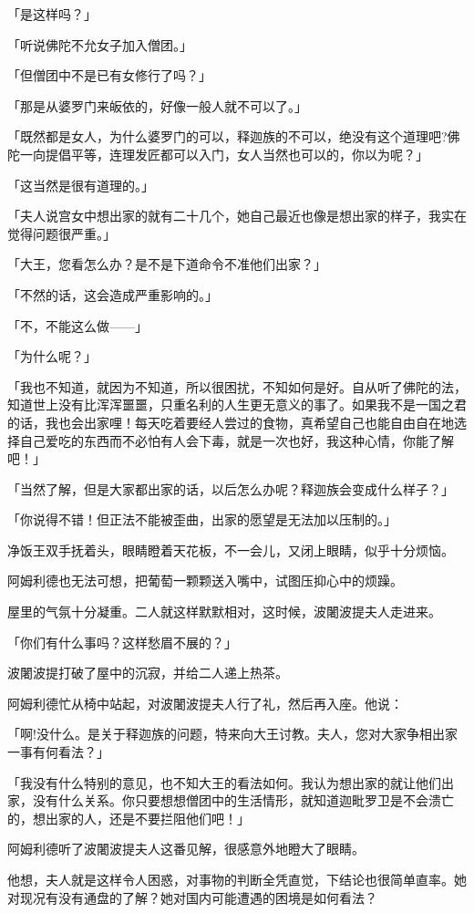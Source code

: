 \documentclass[twoside,openany]{book}
\begin{document}
「是这样吗？」

「听说佛陀不允女子加入僧团。」

「但僧团中不是已有女修行了吗？」

「那是从婆罗门来皈依的，好像一般人就不可以了。」

「既然都是女人，为什么婆罗门的可以，释迦族的不可以，绝没有这个道理吧?佛陀一向提倡平等，连理发匠都可以入门，女人当然也可以的，你以为呢？」

「这当然是很有道理的。」

「夫人说宫女中想出家的就有二十几个，她自己最近也像是想出家的样子，我实在觉得问题很严重。」

「大王，您看怎么办？是不是下道命令不准他们出家？」

「不然的话，这会造成严重影响的。」

「不，不能这么做——」

「为什么呢？」

「我也不知道，就因为不知道，所以很困扰，不知如何是好。自从听了佛陀的法，知道世上没有比浑浑噩噩，只重名利的人生更无意义的事了。如果我不是一国之君的话，我也会出家哩！每天吃着要经人尝过的食物，真希望自己也能自由自在地选择自己爱吃的东西而不必怕有人会下毒，就是一次也好，我这种心情，你能了解吧！」

「当然了解，但是大家都出家的话，以后怎么办呢？释迦族会变成什么样子？」

「你说得不错！但正法不能被歪曲，出家的愿望是无法加以压制的。」

净饭王双手抚着头，眼睛瞪着天花板，不一会儿，又闭上眼睛，似乎十分烦恼。

阿姆利德也无法可想，把葡萄一颗颗送入嘴中，试图压抑心中的烦躁。

屋里的气氛十分凝重。二人就这样默默相对，这时候，波闍波提夫人走进来。

「你们有什么事吗？这样愁眉不展的？」

波闍波提打破了屋中的沉寂，并给二人递上热茶。

阿姆利德忙从椅中站起，对波闍波提夫人行了礼，然后再入座。他说：

「啊!没什么。是关于释迦族的问题，特来向大王讨教。夫人，您对大家争相出家一事有何看法？」

「我没有什么特别的意见，也不知大王的看法如何。我认为想出家的就让他们出家，没有什么关系。你只要想想僧团中的生活情形，就知道迦毗罗卫是不会溃亡的，想出家的人，还是不要拦阻他们吧！」

阿姆利德听了波闍波提夫人这番见解，很感意外地瞪大了眼睛。

他想，夫人就是这样令人困惑，对事物的判断全凭直觉，下结论也很简单直率。她对现况有没有通盘的了解？她对国内可能遭遇的困境是如何看法？
\end{document}

